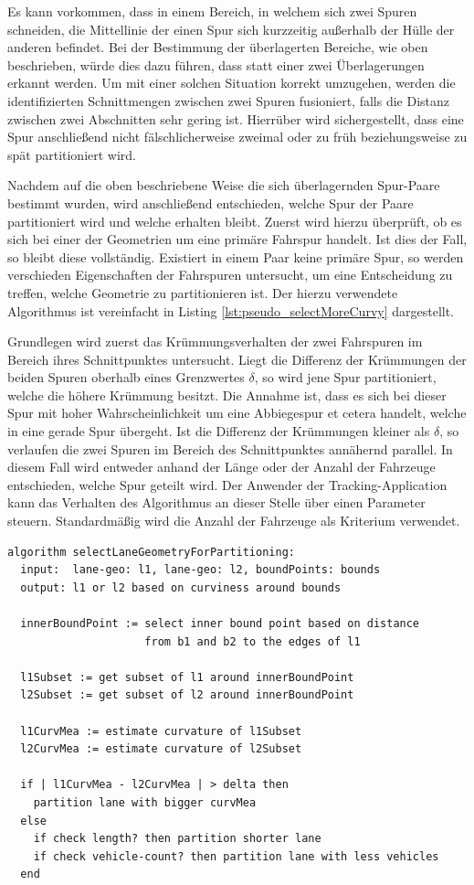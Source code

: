 Es kann vorkommen, dass in einem Bereich, in welchem sich zwei Spuren schneiden,
die Mittellinie der einen Spur sich kurzzeitig außerhalb der Hülle der anderen befindet. Bei der Bestimmung
der überlagerten Bereiche, wie oben beschrieben, würde dies dazu führen, dass statt einer zwei Überlagerungen
erkannt werden. Um mit einer solchen Situation korrekt umzugehen, werden die identifizierten Schnittmengen
zwischen zwei Spuren fusioniert, falls die Distanz zwischen zwei Abschnitten sehr gering ist.
Hierrüber wird sichergestellt, dass eine Spur anschließend nicht fälschlicherweise zweimal
oder zu früh beziehungsweise zu spät partitioniert wird.

Nachdem auf die oben beschriebene Weise die sich überlagernden Spur-Paare bestimmt wurden, wird anschließend
entschieden, welche Spur der Paare partitioniert wird und welche erhalten bleibt. Zuerst wird hierzu
überprüft, ob es sich bei einer der Geometrien um eine primäre Fahrspur handelt. Ist dies der Fall, so
bleibt diese vollständig. Existiert in einem Paar keine primäre Spur, so werden verschieden Eigenschaften
der Fahrspuren untersucht, um eine Entscheidung zu treffen, welche Geometrie zu partitionieren ist.
Der hierzu verwendete Algorithmus ist vereinfacht in Listing \ref{lst:pseudo_selectMoreCurvy} dargestellt.

Grundlegen wird zuerst das Krümmungsverhalten der zwei Fahrspuren im Bereich ihres Schnittpunktes untersucht.
Liegt die Differenz der Krümmungen der beiden Spuren oberhalb eines Grenzwertes $\delta$, so wird
jene Spur partitioniert, welche die höhere Krümmung besitzt. Die Annahme ist, dass es sich bei dieser
Spur mit hoher Wahrscheinlichkeit um eine Abbiegespur et cetera handelt, welche in eine gerade Spur übergeht.
Ist die Differenz der Krümmungen kleiner als $\delta$, so verlaufen die zwei Spuren im Bereich des Schnittpunktes
annähernd parallel. In diesem Fall wird entweder anhand der Länge oder der Anzahl der Fahrzeuge entschieden,
welche Spur geteilt wird. Der Anwender der Tracking-Application kann das Verhalten des Algorithmus an dieser Stelle
über einen Parameter steuern. Standardmäßig wird die Anzahl der Fahrzeuge als Kriterium verwendet.
\begin{lstlisting}[caption=Pseudocode Auswahl gekrümmtr Fahrspur, language=Pseudo, label=lst:pseudo_selectMoreCurvy]
algorithm selectLaneGeometryForPartitioning:
  input:  lane-geo: l1, lane-geo: l2, boundPoints: bounds
  output: l1 or l2 based on curviness around bounds

  innerBoundPoint := select inner bound point based on distance
                     from b1 and b2 to the edges of l1

  l1Subset := get subset of l1 around innerBoundPoint
  l2Subset := get subset of l2 around innerBoundPoint

  l1CurvMea := estimate curvature of l1Subset
  l2CurvMea := estimate curvature of l2Subset

  if | l1CurvMea - l2CurvMea | > delta then
    partition lane with bigger curvMea
  else
    if check length? then partition shorter lane
    if check vehicle-count? then partition lane with less vehicles 
  end
\end{lstlisting}

